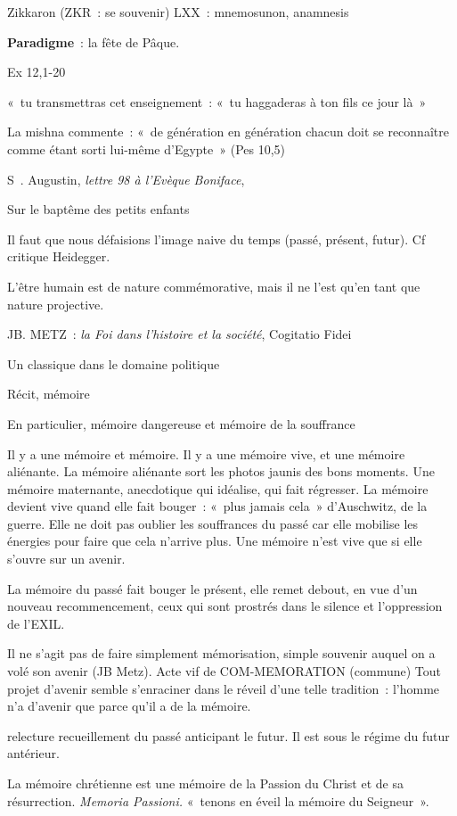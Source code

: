 Zikkaron (ZKR~: se souvenir) LXX~: mnemosunon, anamnesis

\textbf{Paradigme}~: la fête de Pâque.

Ex 12,1-20

«~tu transmettras cet enseignement~: «~tu haggaderas à ton fils ce jour
là~»

La mishna commente~: «~de génération en génération chacun doit se
reconnaître comme étant sorti lui-même d'Egypte~» (Pes 10,5)

S~. Augustin, \emph{lettre 98 à l'Evèque Boniface},

Sur le baptême des petits enfants

Il faut que nous défaisions l'image naive du temps (passé, présent,
futur). Cf critique Heidegger.

L'être humain est de nature commémorative, mais il ne l'est qu'en tant
que nature projective.

JB. METZ~: \emph{la Foi dans l'histoire et la société}, Cogitatio Fidei

Un classique dans le domaine politique

Récit, mémoire

En particulier, mémoire dangereuse et mémoire de la souffrance

Il y a une mémoire et mémoire. Il y a une mémoire vive, et une mémoire
aliénante. La mémoire aliénante sort les photos jaunis des bons moments.
Une mémoire maternante, anecdotique qui idéalise, qui fait régresser. La
mémoire devient vive quand elle fait bouger~: «~plus jamais cela~»
d'Auschwitz, de la guerre. Elle ne doit pas oublier les souffrances du
passé car elle mobilise les énergies pour faire que cela n'arrive plus.
Une mémoire n'est vive que si elle s'ouvre sur un avenir.

La mémoire du passé fait bouger le présent, elle remet debout, en vue
d'un nouveau recommencement, ceux qui sont prostrés dans le silence et
l'oppression de l'EXIL.

Il ne s'agit pas de faire simplement mémorisation, simple souvenir
auquel on a volé son avenir (JB Metz). Acte vif de COM-MEMORATION
(commune) Tout projet d'avenir semble s'enraciner dans le réveil d'une
telle tradition~: l'homme n'a d'avenir que parce qu'il a de la mémoire.

relecture recueillement du passé anticipant le futur. Il est sous le
régime du futur antérieur.

La mémoire chrétienne est une mémoire de la Passion du Christ et de sa
résurrection. \emph{Memoria Passioni.} «~tenons en éveil la mémoire du
Seigneur~».

